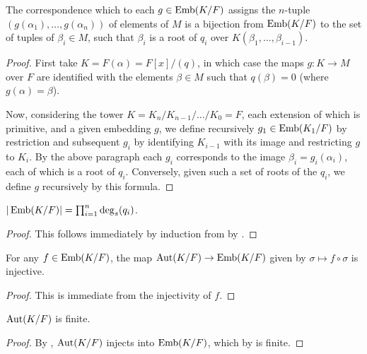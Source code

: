 \begin{lemma} The correspondence which to each $g \in \operatorname{\text{Emb}}(K/F)$ assigns the
$n$-tuple $(g(\alpha_1), \dots, g(\alpha_n))$ of elements of $M$ is a
bijection from $\operatorname{\text{Emb}}(K/F)$ to the set of tuples of $\beta_i \in M$, such that
$\beta_i$ is a root of $q_i$ over $K(\beta_1, \dots, \beta_{i - 1})$.
\label{emb_roots}
\end{lemma}

\begin{proof} First take $K = F(\alpha) = F[x]/(q)$, in which case the maps $g
\colon K \to M$ over $F$ are identified with the elements $\beta \in M$ such
that $q(\beta) = 0$ (where $g(\alpha) = \beta$).

Now, considering the tower $K = K_n / K_{n - 1} / \dots / K_0 = F$, each
extension of which is primitive, and a given embedding $g$, we define
recursively $g_1 \in \operatorname{\text{Emb}}(K_1/F)$ by restriction and subsequent $g_i$ by
identifying $K_{i - 1}$ with its image and restricting $g$ to $K_i$.  By the
above paragraph each $g_i$ corresponds to the image $\beta_i = g_i(\alpha_i)$,
each of which is a root of $q_i$.  Conversely, given such a set of roots of
the $q_i$, we define $g$ recursively by this formula. \end{proof}

\begin{corollary} $|\operatorname{\text{Emb}}(K/F)| = \prod_{i = 1}^n \deg_s(q_i)$.
\label{emb_size}
\end{corollary}

\begin{proof} This follows immediately by induction from  by
. \end{proof}

\begin{lemma} For any $f \in \operatorname{\text{Emb}}(K/F)$, the map $\operatorname{\text{Aut}}(K/F) \to \operatorname{\text{Emb}}(K/F)$ given
by $\sigma \mapsto f \circ \sigma$ is injective.  
\label{aut_inj}
\end{lemma}

\begin{proof} This is immediate from the injectivity of $f$. \end{proof}

\begin{corollary} $\operatorname{\text{Aut}}(K/F)$ is finite.
\label{aut_fin}
\end{corollary}

\begin{proof} By , $\operatorname{\text{Aut}}(K/F)$ injects into $\operatorname{\text{Emb}}(K/F)$, which by
 is finite. \end{proof}


